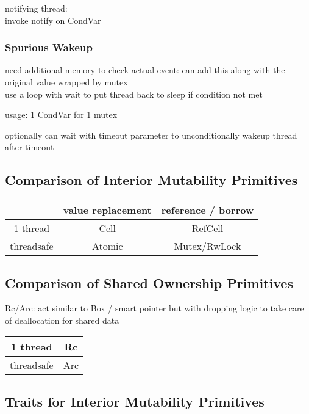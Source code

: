 \documentclass[8pt]{extarticle}
\begin{document}
\begin{multicols*}{2}
  notifying thread:\\
  invoke notify on CondVar

  \subsubsection{Spurious Wakeup}
  need additional memory to check actual event: can add this along with the original value wrapped by mutex\\
  use a loop with wait to put thread back to sleep if condition not met
  
  usage: 1 CondVar for 1 mutex

  optionally can wait with timeout parameter to unconditionally wakeup thread after timeout

  \subsection{Comparison of Interior Mutability Primitives}
  \begin{tabular}{| c | c | c |}
    \hline
    & value replacement & reference / borrow \\
    \hline
    1  thread & Cell & RefCell \\
    \hline
    threadsafe & Atomic & Mutex/RwLock \\
    \hline
  \end{tabular}

  \subsection{Comparison of Shared Ownership Primitives}
  Rc/Arc: act similar to Box / smart pointer but with dropping logic to take care of deallocation for shared data\\
  
  \begin{tabular}{| c | c |}
    \hline
    1  thread & Rc \\
    \hline
    threadsafe & Arc \\
    \hline
  \end{tabular}
  
  \subsection{Traits for Interior Mutability Primitives}


\end{multicols*}
\end{document}
